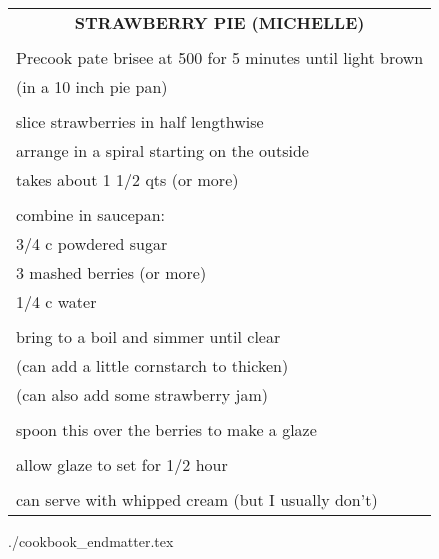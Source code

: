 \documentclass[8pt]{report}
\begin{document}
\begin{tabular}{|l|} \hline	%
 
\multicolumn{1}{|c|}{\textbf{STRAWBERRY PIE (MICHELLE)}}
\\
\\

\index{desserts!strawberry pie (michelle)} \index{strawberry pie}
\index{pie!strawberry}

Precook pate brisee at 500 for 5 minutes until light brown\\
(in a 10 inch pie pan)\\
\\
slice strawberries in half lengthwise\\
arrange in a spiral starting on the outside\\
takes about 1 1/2 qts (or more)\\
\\
combine in saucepan:\\
\hspace{0.5 in}	3/4 c powdered sugar\\
\hspace{0.5 in}	3 mashed berries (or more)\\
\hspace{0.5 in}	1/4 c water\\
\\
bring to a boil and simmer until clear\\
(can add a little cornstarch to thicken)\\
(can also add some strawberry jam)\\
\\
spoon this over the berries to make a glaze\\
\\
allow glaze to set for 1/2 hour\\
\\
can serve with whipped cream (but I usually don't)\\



\hline

\end{tabular}

\newpage
 {./cookbook_endmatter.tex}
\end{document}
